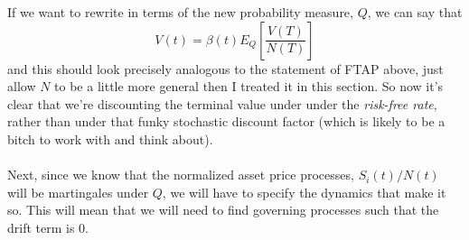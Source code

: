 \documentclass[12pt]{article}
\theoremstyle{plain}
\theoremstyle{definition}
\theoremstyle{remark}
\begin{document}
If we want to rewrite in terms of the new probability measure, $Q$,
we can say that
   \[V(t) = \beta(t) E_Q\left[\frac{V(T)}{N(T)}\right] \] 
and this should look precisely analogous to the statement of FTAP 
above, just allow $N$ to be a little more general then I treated
it in this section. So now it's clear that we're discounting
the terminal value under under the \emph{risk-free rate}, rather
than under that funky stochastic discount factor (which is likely
to be a bitch to work with and think about). 
\\
\\
Next, since we know that the normalized asset price processes, 
$S_i(t)/N(t)$ will be martingales under $Q$, 
we will have to specify the dynamics that make it so.
This will mean that we will need to find governing processes such that
the drift term is 0.



%
\end{document}
